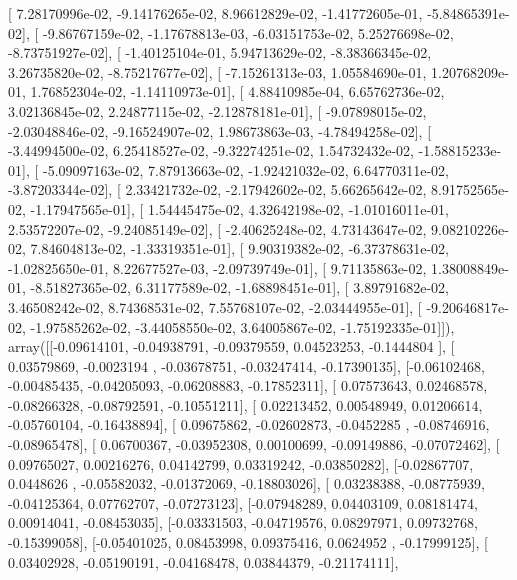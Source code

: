 \documentclass{article}
\begin{document}
       [  7.28170996e-02,  -9.14176265e-02,   8.96612829e-02,
         -1.41772605e-01,  -5.84865391e-02],
       [ -9.86767159e-02,  -1.17678813e-03,  -6.03151753e-02,
          5.25276698e-02,  -8.73751927e-02],
       [ -1.40125104e-01,   5.94713629e-02,  -8.38366345e-02,
          3.26735820e-02,  -8.75217677e-02],
       [ -7.15261313e-03,   1.05584690e-01,   1.20768209e-01,
          1.76852304e-02,  -1.14110973e-01],
       [  4.88410985e-04,   6.65762736e-02,   3.02136845e-02,
          2.24877115e-02,  -2.12878181e-01],
       [ -9.07898015e-02,  -2.03048846e-02,  -9.16524907e-02,
          1.98673863e-03,  -4.78494258e-02],
       [ -3.44994500e-02,   6.25418527e-02,  -9.32274251e-02,
          1.54732432e-02,  -1.58815233e-01],
       [ -5.09097163e-02,   7.87913663e-02,  -1.92421032e-02,
          6.64770311e-02,  -3.87203344e-02],
       [  2.33421732e-02,  -2.17942602e-02,   5.66265642e-02,
          8.91752565e-02,  -1.17947565e-01],
       [  1.54445475e-02,   4.32642198e-02,  -1.01016011e-01,
          2.53572207e-02,  -9.24085149e-02],
       [ -2.40625248e-02,   4.73143647e-02,   9.08210226e-02,
          7.84604813e-02,  -1.33319351e-01],
       [  9.90319382e-02,  -6.37378631e-02,  -1.02825650e-01,
          8.22677527e-03,  -2.09739749e-01],
       [  9.71135863e-02,   1.38008849e-01,  -8.51827365e-02,
          6.31177589e-02,  -1.68898451e-01],
       [  3.89791682e-02,   3.46508242e-02,   8.74368531e-02,
          7.55768107e-02,  -2.03444955e-01],
       [ -9.20646817e-02,  -1.97585262e-02,  -3.44058550e-02,
          3.64005867e-02,  -1.75192335e-01]]), array([[-0.09614101, -0.04938791, -0.09379559,  0.04523253, -0.1444804 ],
       [ 0.03579869, -0.0023194 , -0.03678751, -0.03247414, -0.17390135],
       [-0.06102468, -0.00485435, -0.04205093, -0.06208883, -0.17852311],
       [ 0.07573643,  0.02468578, -0.08266328, -0.08792591, -0.10551211],
       [ 0.02213452,  0.00548949,  0.01206614, -0.05760104, -0.16438894],
       [ 0.09675862, -0.02602873, -0.0452285 , -0.08746916, -0.08965478],
       [ 0.06700367, -0.03952308,  0.00100699, -0.09149886, -0.07072462],
       [ 0.09765027,  0.00216276,  0.04142799,  0.03319242, -0.03850282],
       [-0.02867707,  0.0448626 , -0.05582032, -0.01372069, -0.18803026],
       [ 0.03238388, -0.08775939, -0.04125364,  0.07762707, -0.07273123],
       [-0.07948289,  0.04403109,  0.08181474,  0.00914041, -0.08453035],
       [-0.03331503, -0.04719576,  0.08297971,  0.09732768, -0.15399058],
       [-0.05401025,  0.08453998,  0.09375416,  0.0624952 , -0.17999125],
       [ 0.03402928, -0.05190191, -0.04168478,  0.03844379, -0.21174111],
\end{document}
